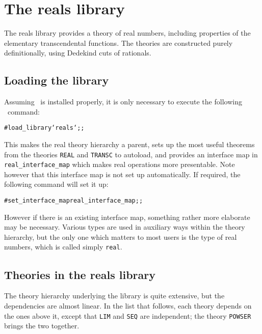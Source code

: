 \chapter{The reals library}

The reals library provides a theory of real numbers, including properties of
the elementary transcendental functions. The theories are constructed purely
definitionally, using Dedekind cuts of rationals.

\section{Loading the library}

Assuming \HOL\ is installed properly, it is only necessary to execute the
following \ML\ command:

\begin{session}\begin{alltt}
#load_library `reals`;;
\end{alltt}\end{session}

This makes the real theory hierarchy a parent, sets up the most useful theorems
from the theories {\tt REAL} and {\tt TRANSC} to autoload, and provides an
interface map in {\tt real\_interface\_map} which makes real operations more
presentable. Note however that this interface map is not set up automatically.
If required, the following command will set it up:

\begin{session}\begin{alltt}
#set\_interface\_map real\_interface\_map;;
\end{alltt}\end{session}

However if there is an existing interface map, something rather more elaborate
may be necessary. Various types are used in auxiliary ways within the theory
hierarchy, but the only one which matters to most users is the type of real
numbers, which is called simply {\tt real}.

\section{Theories in the reals library}

The theory hierarchy underlying the library is quite extensive, but the
dependencies are almost linear. In the list that follows, each theory depends
on the ones above it, except that {\tt LIM} and {\tt SEQ} are independent; the
theory {\tt POWSER} brings the two together.

